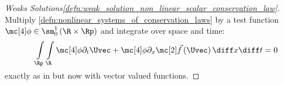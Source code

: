 \begin{proofbox}\nospacing
    \begin{proof}[Weaks Solutions\cref{defn:weak_solution_non_linear_scalar_conservation_law}]\leavevmode\\
        \label{proof:defn:weak_solution_non_linear_scalar_conservation_law}
        Multiply \cref{defn:nonlinear_systems_of_conservation_laws} by a test function $\testfunc\in\sm_{0}^{1}\left(\R\times\Rp\right)$
        and integrate over space and time:
        \begin{align*}
            &&&\int\limits_{\Rp}\int\limits_{\R}\testfunc\partial_{t}\Uvec+\testfunc\partial_{x}\fluxvec\left(\Uvec\right)\diff x\diff t=0 \\[-1\jot]
        \end{align*}
        exactly as in  but now with vector valued functions.
    \end{proof}
\end{proofbox}

